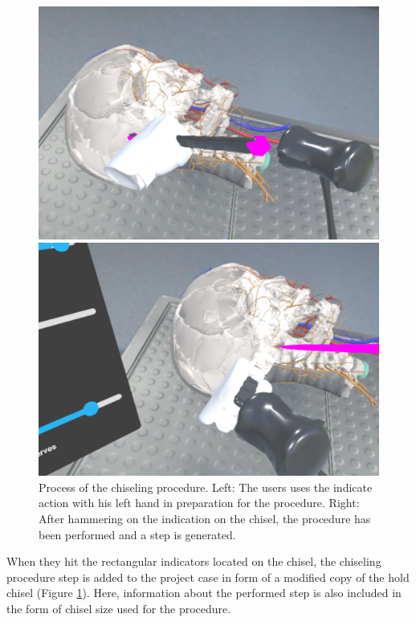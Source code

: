 \begin{figure}[ht]
    \centering
    \begin{minipage}{.5\textwidth}
      \centering
      \includegraphics[width=0.99\linewidth]{images/implementation/features/procedures/chisel_1.png}
    \end{minipage}%
    \begin{minipage}{.5\textwidth}
      \centering
      \includegraphics[width=0.99\linewidth]{images/implementation/features/procedures/chisel_2.png}
    \end{minipage}
    \caption{\label{fig::ChiselProcedure}Process of the chiseling procedure. Left: The users uses the indicate action with his left hand in preparation for the procedure. Right: After hammering on the indication on the chisel, the procedure has been performed and a step is generated.}
\end{figure}

When they hit the rectangular indicators located on the chisel, the chiseling procedure step is added to the project case in form of a modified copy of the hold chisel (Figure \ref{fig::ChiselProcedure}).
Here, information about the performed step is also included in the form of chisel size used for the procedure. 